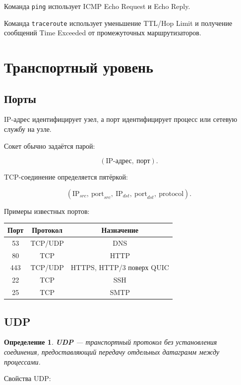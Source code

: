 \documentclass[12pt,a4paper]{article}
\newtheorem{definition}{Определение}
\begin{document}
Команда \texttt{ping} использует ICMP Echo Request и Echo Reply.

Команда \texttt{traceroute} использует уменьшение TTL/Hop Limit и получение сообщений Time Exceeded от промежуточных маршрутизаторов.

\section{Транспортный уровень}

\subsection{Порты}

IP-адрес идентифицирует узел, а порт идентифицирует процесс или сетевую службу на узле.

Сокет обычно задаётся парой:

\[
(\text{IP-адрес},\ \text{порт}).
\]

TCP-соединение определяется пятёркой:

\[
(\text{IP}_{src},\ \text{port}_{src},\ \text{IP}_{dst},\ \text{port}_{dst},\ \text{protocol}).
\]

Примеры известных портов:

\begin{center}
\begin{tabular}{|c|c|c|}
\hline
\textbf{Порт} & \textbf{Протокол} & \textbf{Назначение} \\
\hline
53 & TCP/UDP & DNS \\
\hline
80 & TCP & HTTP \\
\hline
443 & TCP/UDP & HTTPS, HTTP/3 поверх QUIC \\
\hline
22 & TCP & SSH \\
\hline
25 & TCP & SMTP \\
\hline
\end{tabular}
\end{center}

\subsection{UDP}

\begin{definition}
\textbf{UDP} --- транспортный протокол без установления соединения, предоставляющий передачу отдельных датаграмм между процессами.
\end{definition}

Свойства UDP:
\end{document}

